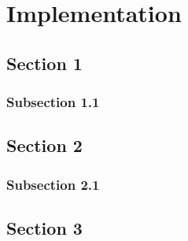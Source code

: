 \chapter{Implementation}

\section{Section 1}

\subsection{Subsection 1.1}

\section{Section 2}

\subsection{Subsection 2.1}

\section{Section 3}